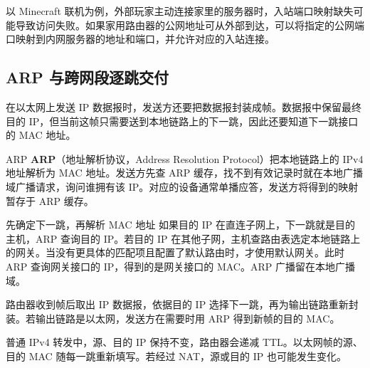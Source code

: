 \begin{remark}
以 Minecraft 联机为例，外部玩家主动连接家里的服务器时，入站端口映射缺失可能导致访问失败。如果家用路由器的公网地址可从外部到达，可以将指定的公网端口映射到内网服务器的地址和端口，并允许对应的入站连接。
\end{remark}

\subsection{ARP 与跨网段逐跳交付}
在以太网上发送 IP 数据报时，发送方还要把数据报封装成帧。数据报中保留最终目的 IP，但当前这帧只需要送到本地链路上的下一跳，因此还要知道下一跳接口的 MAC 地址。
\begin{definition}{ARP}
\textbf{ARP}（地址解析协议，Address Resolution Protocol）把本地链路上的 IPv4 地址解析为 MAC 地址。发送方先查 ARP 缓存，找不到有效记录时就在本地广播域广播请求，询问谁拥有该 IP。对应的设备通常单播应答，发送方将得到的映射暂存于 ARP 缓存。
\end{definition}

\begin{proposition}{先确定下一跳，再解析 MAC 地址}
如果目的 IP 在直连子网上，下一跳就是目的主机，ARP 查询目的 IP。若目的 IP 在其他子网，主机查路由表选定本地链路上的网关。当没有更具体的匹配项且配置了默认路由时，才使用默认网关。此时 ARP 查询网关接口的 IP，得到的是网关接口的 MAC。ARP 广播留在本地广播域。

路由器收到帧后取出 IP 数据报，依据目的 IP 选择下一跳，再为输出链路重新封装。若输出链路是以太网，发送方在需要时用 ARP 得到新帧的目的 MAC。
\end{proposition}

\begin{remark}
普通 IPv4 转发中，源、目的 IP 保持不变，路由器会递减 TTL。以太网帧的源、目的 MAC 随每一跳重新填写。若经过 NAT，源或目的 IP 也可能发生变化。
\end{remark}

